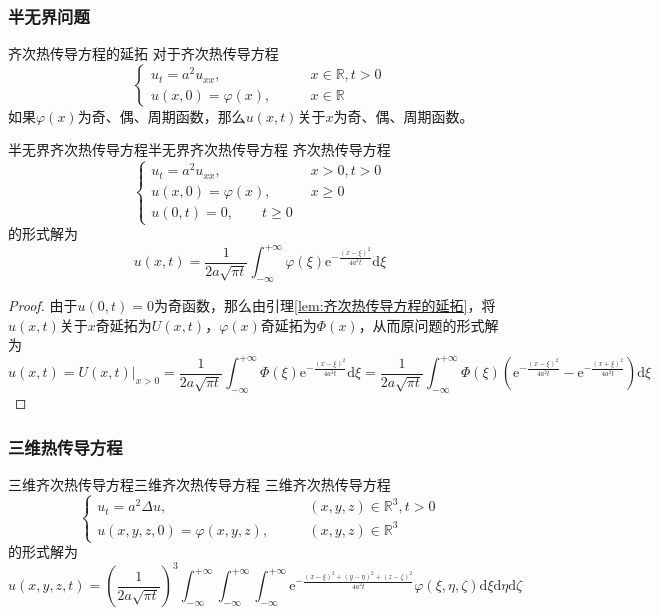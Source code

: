 \documentclass[lang = cn, scheme = chinese, thmcnt = section]{elegantbook}
\newcommand{\R}{\mathbb{R}}            %
\newcommand{\dd}{\mathrm{d}}           %
\newcommand{\ee}[1]{\mathrm{e}^{#1}}   %
\begin{document}
\subsubsection{半无界问题}

\begin{lemma}{}{齐次热传导方程的延拓}
	对于齐次热传导方程
	$$
	\begin{cases}
		u_t=a^2u_{xx},\qquad & x\in\R,t>0\\
		u(x,0)=\varphi(x),\qquad & x\in\R
	\end{cases}
	$$
	如果$\varphi(x)$为奇、偶、周期函数，那么$u(x,t)$关于$x$为奇、偶、周期函数。
\end{lemma}

\begin{theorem}{半无界齐次热传导方程}{半无界齐次热传导方程}
	齐次热传导方程
	$$
	\begin{cases}
		u_t=a^2u_{xx},\qquad & x>0,t>0\\
		u(x,0)=\varphi(x),\qquad & x\ge 0\\
		u(0,t)=0,\qquad t\ge 0
	\end{cases}
	$$
	的形式解为
	$$
	u(x,t)
	=\frac{1}{2a\sqrt{\pi t}}\int_{-\infty}^{+\infty}\varphi(\xi)\ee{-\frac{(x-\xi)^2}{4a^2t}}\dd\xi
	$$
\end{theorem}

\begin{proof}
	由于$u(0,t)=0$为奇函数，那么由引理\ref{lem:齐次热传导方程的延拓}，将$u(x,t)$关于$x$奇延拓为$U(x,t)$，$\varphi(x)$奇延拓为$\Phi(x)$，从而原问题的形式解为
	$$
	u(x,t)=U(x,t)\Big|_{x>0}
	=\frac{1}{2a\sqrt{\pi t}}\int_{-\infty}^{+\infty}\Phi(\xi)\ee{-\frac{(x-\xi)^2}{4a^2t}}\dd\xi
	=\frac{1}{2a\sqrt{\pi t}}\int_{-\infty}^{+\infty}\Phi(\xi)\left(\ee{-\frac{(x-\xi)^2}{4a^2t}}-\ee{-\frac{(x+\xi)^2}{4a^2t}}\right)\dd\xi
	$$
\end{proof}

\subsubsection{三维热传导方程}

\begin{theorem}{三维齐次热传导方程}{三维齐次热传导方程}
	三维齐次热传导方程
	$$
	\begin{cases}
		u_t=a^2\Delta u,\qquad & (x,y,z)\in\R^3,t>0\\
		u(x,y,z,0)=\varphi(x,y,z),\qquad & (x,y,z)\in\R^3
	\end{cases}
	$$
	的形式解为
	$$
	u(x,y,z,t)
	=\left(\frac{1}{2a\sqrt{\pi t}}\right)^3
	\int_{-\infty}^{+\infty}\int_{-\infty}^{+\infty}\int_{-\infty}^{+\infty}
	\ee{-\frac{(x-\xi)^2+(y-\eta)^2+(z-\zeta)^2}{4a^2t}}\varphi(\xi,\eta,\zeta)\dd\xi\dd\eta\dd\zeta
	$$
\end{theorem}
\end{document}
